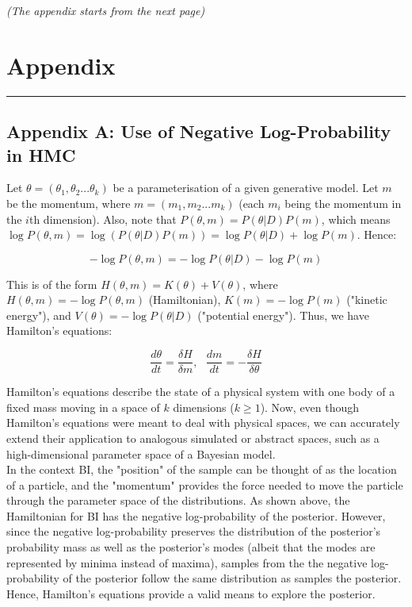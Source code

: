 \documentclass[conference]{IEEEtran}
\begin{document}
\textit{(The appendix starts from the next page)}

\clearpage

\section*{Appendix}

\par\noindent\rule{0.49\textwidth}{0.1pt}

\subsection*{Appendix A: Use of Negative Log-Probability in HMC}
Let $\theta = (\theta_1, \theta_2 ... \theta_k)$ be a parameterisation of a given generative model. Let $m$ be the momentum, where $m = (m_1, m_2 ... m_k)$ (each $m_i$ being the momentum in the $i$th dimension). Also, note that $P(\theta, m) = P(\theta|D)P(m)$, which means $\log P(\theta, m) = \log (P(\theta|D) P(m)) = \log P(\theta|D) + \log P(m)$. Hence:

\begin{equation*}
	- \log P(\theta, m) = - \log P(\theta|D) - \log P(m)
\end{equation*}

This is of the form $H(\theta, m) = K(\theta) + V(\theta)$, where $H(\theta, m) = - \log P(\theta, m)$ (Hamiltonian),  $K(m) = - \log P(m)$ ("kinetic energy"), and $V(\theta) = - \log P(\theta|D)$ ("potential energy"). Thus, we have Hamilton's equations:

\begin{equation*}
	\frac{d \theta}{dt} = \frac{\delta H}{\delta m}, \text{ } \frac{dm}{dt} = - \frac{\delta H}{\delta \theta}
\end{equation*}

Hamilton's equations describe the state of a physical system with one body of a fixed mass moving in a space of $k$ dimensions ($k \geq 1$). Now, even though Hamilton's equations were meant to deal with physical spaces, we can accurately extend their application to analogous simulated or abstract spaces, such as a high-dimensional parameter space of a Bayesian model.\\

In the context BI, the "position" of the sample can be thought of as the location of a particle, and the "momentum" provides the force needed to move the particle through the parameter space of the distributions. As shown above, the Hamiltonian for BI has the negative log-probability of the posterior. However, since the negative log-probability preserves the distribution of the posterior's probability mass as well as the posterior's modes (albeit that the modes are represented by minima instead of maxima), samples from the the negative log-probability of the posterior follow the same distribution as samples the posterior. Hence, Hamilton's equations provide a valid means to explore the posterior.
\end{document}
